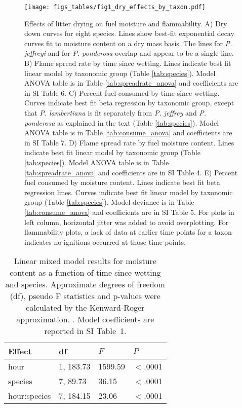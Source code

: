 \documentclass[letterpaper,12pt]{article}
\begin{document}
\begin{figure}
  \centering
  \texttt{[image: figs\_tables/fig1\_dry\_effects\_by\_taxon.pdf]}
  \caption{}
\end{figure}
\begin{figure}
  \captionsetup{labelformat=adja-page}
  \ContinuedFloat
  \caption{Effects of litter drying on fuel moisture and flammability. A) Dry
    down curves for eight species. Lines show best-fit exponential decay curves
    fit to moisture content on a dry mass basis. The lines for \emph{P.
      jeffreyi} and for \emph{P. ponderosa} overlap and appear to be a single
    line. B) Flame spread rate by time since wetting. Lines indicate best fit
    linear model by taxonomic group (Table \ref{tab:species}). Model ANOVA
    table is in Table \ref{tab:spreadrate_anova} and coefficients are in SI Table 6.
    C) Percent fuel consumed by time since wetting. Curves indicate best fit
    beta regression by taxonomic group, except that \emph{P. lambertiana}
    is fit separately from \emph{P. jeffrey} and \emph{P. ponderosa} as
    explained in the text (Table \ref{tab:species}). Model ANOVA table is in Table
    \ref{tab:consume_anova} and coefficients are in SI Table 7. D) Flame spread
    rate by fuel moisture content. Lines indicate best fit linear model by
    taxonomic group (Table \ref{tab:species}). Model ANOVA table is in Table
    \ref{tab:spreadrate_anova} and coefficients are in SI Table 4. E) Percent fuel
    consumed by moisture content. Lines indicate best fit beta regression
    lines. Curves indicate best fit linear model by taxonomic group (Table
    \ref{tab:species}). Model deviance is in Table \ref{tab:consume_anova}
    and coefficients are in SI Table 5. For plots in left column, horizontal
    jitter was added to avoid overplotting. For flammability plots, a lack of
    data at earlier time points for a taxon indicates no ignitions occurred at
    those time points.}
 \label{fig:drydown}
\end{figure}


\begin{table}
  \caption{Linear mixed model results for moisture content as a function of
    time since wetting and species. Approximate degrees of freedom (df), pseudo F
    statistics and p-values were calculated by the Kenward-Roger approximation.
    \citep{Kenward_Roger-1997}. Model coefficients are reported in SI Table~1.
  \label{tab:drydown}}
\centering
\begin{tabular}{llll}
  \toprule
Effect & df & $F$ & $P$ \\ 
  \midrule
  hour & 1, 183.73 & 1599.59 & $<$.0001 \\ 
  species & 7, 89.73 & 36.15 & $<$.0001 \\ 
  hour:species & 7, 184.15 & 23.06 & $<$.0001 \\ 
   \bottomrule
\end{tabular}
\end{table}
\end{document}
